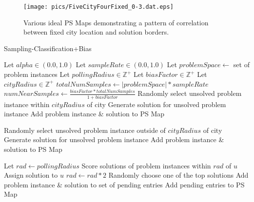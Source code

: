 \begin{figure}
\begin{center}
\texttt{[image: pics/FiveCityFourFixed\_0-3.dat.eps]}
\caption{Various ideal PS Maps demonstrating a pattern of correlation between fixed city location and solution borders.}
\label{fig:five_city_tsps_scbias_motivation}
\end{center}
\end{figure}



\begin{algorithm}
\caption{Sampling-Classification+Bias}   
\label{alg:sc+bias}
\small
\begin{algorithmic}[1] %
  
  \State Let $alpha \in (0.0,1.0)$
  \State Let $sampleRate \in (0.0,1.0)$
  \State Let $problemSpace \leftarrow$ set of problem instances
  \State Let $pollingRadius \in \mathbb{Z}^+$ 
  \State Let $biasFactor \in \mathbb{Z}^+$ 
  \State Let $cityRadius \in \mathbb{Z}^+$ 
  \State $totalNumSamples \leftarrow |problemSpace| * sampleRate$
  \State $numNearSamples \leftarrow \frac{biasFactor * totalNumSamples}{1+biasFactor}$
    \State Randomly select unsolved problem instance within $cityRadius$ of city
    \State Generate solution for unsolved problem instance
    \State Add problem instance \& solution to PS Map
  \EndFor

    \State Randomly select unsolved problem instance outside of $cityRadius$ of city
    \State Generate solution for unsolved problem instance
    \State Add problem instance \& solution to PS Map
  \EndFor

    \State Let $rad \leftarrow pollingRadius$
      \State Score solutions of problem instances within $rad$ of $u$
        \State Assign solution to $u$
      \Else 
        \State $rad \leftarrow rad * 2$
      \EndIf
    \EndWhile
      \State Randomly choose one of the top solutions
    \EndIf
    \State Add problem instance \& solution to set of pending entries 
  \EndFor
  \State Add pending entries to PS Map 
\end{algorithmic}
\end{algorithm}






